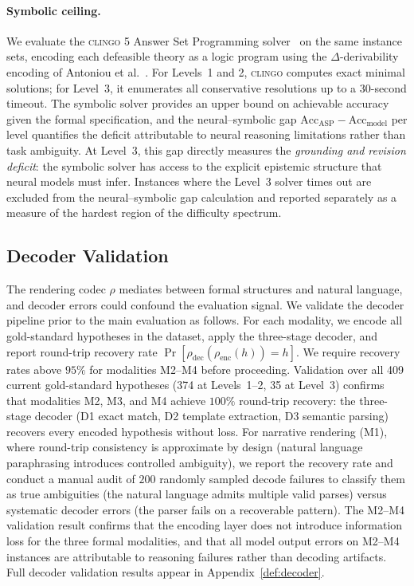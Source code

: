 \documentclass{article}
\theoremstyle{definition}
\begin{document}
\paragraph{Symbolic ceiling.} We evaluate the \textsc{clingo} 5 Answer Set Programming solver~\cite{gebser2014clingo} on the same instance sets, encoding each defeasible theory as a logic program using the $\Delta$-derivability encoding of Antoniou et al.~\cite{antoniou2001defeasible}. For Levels~1 and 2, \textsc{clingo} computes exact minimal solutions; for Level~3, it enumerates all conservative resolutions up to a 30-second timeout. The symbolic solver provides an upper bound on achievable accuracy given the formal specification, and the neural--symbolic gap $\mathrm{Acc}_{\mathrm{ASP}} - \mathrm{Acc}_{\mathrm{model}}$ per level quantifies the deficit attributable to neural reasoning limitations rather than task ambiguity. At Level~3, this gap directly measures the \emph{grounding and revision deficit}: the symbolic solver has access to the explicit epistemic structure that neural models must infer. Instances where the Level~3 solver times out are excluded from the neural--symbolic gap calculation and reported separately as a measure of the hardest region of the difficulty spectrum.


\subsection{Decoder Validation}\label{subsec:decoder_validation}

The rendering codec $\rho$ mediates between formal structures and natural language, and decoder errors could confound the evaluation signal. We validate the decoder pipeline prior to the main evaluation as follows. For each modality, we encode all gold-standard hypotheses in the dataset, apply the three-stage decoder, and report round-trip recovery rate $\Pr[\rho_{\mathrm{dec}}(\rho_{\mathrm{enc}}(h)) = h]$. We require recovery rates above $95\%$ for modalities M2--M4 before proceeding. Validation over all 409 current gold-standard hypotheses (374 at Levels~1--2, 35 at Level~3) confirms that modalities M2, M3, and M4 achieve $100\%$ round-trip recovery: the three-stage decoder (D1 exact match, D2 template extraction, D3 semantic parsing) recovers every encoded hypothesis without loss. For narrative rendering (M1), where round-trip consistency is approximate by design (natural language paraphrasing introduces controlled ambiguity), we report the recovery rate and conduct a manual audit of $200$ randomly sampled decode failures to classify them as true ambiguities (the natural language admits multiple valid parses) versus systematic decoder errors (the parser fails on a recoverable pattern). The M2--M4 validation result confirms that the encoding layer does not introduce information loss for the three formal modalities, and that all model output errors on M2--M4 instances are attributable to reasoning failures rather than decoding artifacts. Full decoder validation results appear in Appendix~\ref{def:decoder}.
\end{document}

